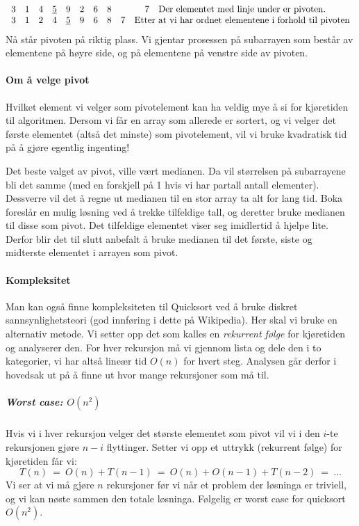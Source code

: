 \begin{eks} ~\newline
\[
  \begin{array}{c c c c c c c c c}
    3&1&4&\underline{5}&9&2&6&8&7 \quad \text{Der elementet med linje under er pivoten.}\\
    3&1&2&4&\underline{5}&9&6&8&7 \quad \text{Etter at vi har ordnet elementene
    i forhold til pivoten}
  \end{array}
\]
Nå står pivoten på riktig plass. Vi gjentar prosessen på subarrayen som består
av elementene på høyre side, og på elementene på venstre side av pivoten.
\end{eks}

\paragraph{Om å velge pivot}
Hvilket element vi velger som pivotelement kan ha veldig mye å si for kjøretiden
til algoritmen. Dersom vi får en array som allerede er sortert, og vi velger det
første elementet (altså det minste) som pivotelement, vil vi bruke kvadratisk
tid på å gjøre egentlig ingenting!

Det beste valget av pivot, ville vært medianen. Da vil størrelsen på
subarrayene bli det samme (med en forskjell på 1 hvis vi har partall antall
elementer). Dessverre vil det å regne ut medianen til en stor array ta alt for
lang tid. Boka foreslår en mulig løsning ved å trekke tilfeldige tall, og
deretter bruke medianen til disse som pivot. Det tilfeldige elementet viser seg
imidlertid å hjelpe lite. Derfor blir det til slutt anbefalt å bruke medianen
til det første, siste og midterste elementet i arrayen som pivot.


\paragraph{Kompleksitet}
Man kan også finne kompleksiteten til Quicksort ved å bruke diskret sannsynlighetsteori (god innføring i dette på Wikipedia). Her skal vi bruke en alternativ metode. Vi setter opp det som kalles en \emph{rekurrent følge} for kjøretiden og analyserer den. For hver rekursjon må vi gjennom lista og dele den i to kategorier, vi har altså lineær tid $ O(n) $ for hvert steg. Analysen går derfor i hovedsak ut på å finne ut hvor mange rekursjoner som må til. 

\subparagraph{Worst case: $ O(n^2) $}
Hvis vi i hver rekursjon velger det største elementet som pivot vil vi i den $ i $-te rekursjonen gjøre $ n-i $ flyttinger. Setter vi opp et uttrykk (rekurrent følge) for kjøretiden får vi:
\[ T(n) ~=~ O(n) + T(n-1) ~=~ O(n) + O(n-1) + T(n-2) ~=~ ... \]
Vi ser at vi må gjøre $ n $ rekursjoner før vi når et problem der løsninga er triviell, og vi kan nøste sammen den totale løsninga. Følgelig er worst case for quicksort $ O(n^2) $.

